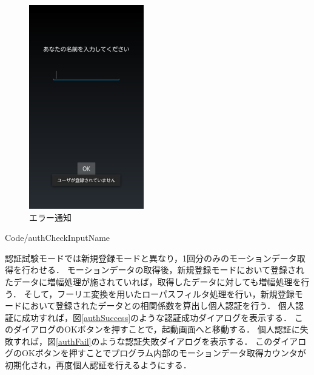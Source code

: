 \documentclass[11pt]{jreport}
\renewcommand{\slash}{/}
\begin{document}
\begin{figure}[tbp]
            \begin{minipage}{0.33\hsize}
                \begin{center}
                    \includegraphics[width=5cm, bb=0 0 540 960]{AuthNameInputError.pdf}
                \end{center}
                \caption{エラー通知}
                \label{authNameInputError}
            \end{minipage}
        \end{figure}

        \newpage
        
        {Code\slash authCheckInputName}

        認証試験モードでは新規登録モードと異なり，1回分のみのモーションデータ取得を行わせる．
        モーションデータの取得後，新規登録モードにおいて登録されたデータに増幅処理が施されていれば，取得したデータに対しても増幅処理を行う．
        そして，フーリエ変換を用いたローパスフィルタ処理を行い，新規登録モードにおいて登録されたデータとの相関係数を算出し個人認証を行う．
        個人認証に成功すれば，図\ref{authSuccess}のような認証成功ダイアログを表示する．
        このダイアログのOKボタンを押すことで，起動画面へと移動する．
        個人認証に失敗すれば，図\ref{authFail}のような認証失敗ダイアログを表示する．
        このダイアログのOKボタンを押すことでプログラム内部のモーションデータ取得カウンタが初期化され，再度個人認証を行えるようにする．
\end{document}

